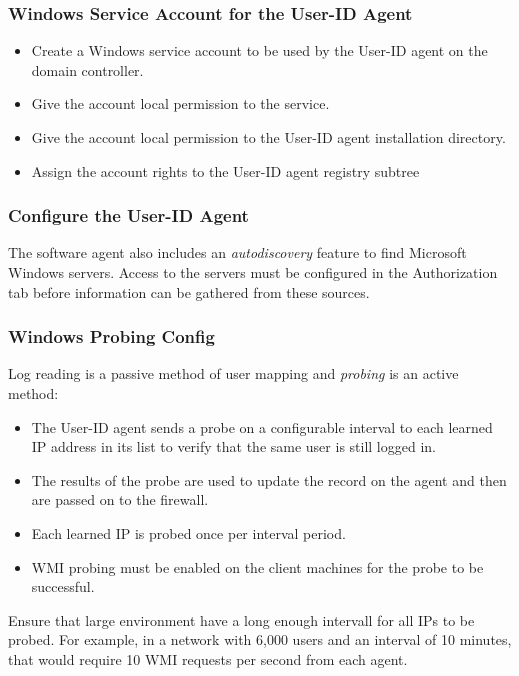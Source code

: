 \subsubsection{Windows Service Account for the User-ID Agent}
\begin{itemize}
    \item Create a Windows service account to be used by the User-ID agent on the domain controller.
    \item Give the account local permission to the service.
    \item Give the account local permission to the User-ID agent installation directory.
    \item Assign the account rights to the User-ID agent registry subtree
\end{itemize}

\subsubsection{Configure the User-ID Agent}
The software agent also includes an \textit{autodiscovery} feature to find Microsoft Windows servers.
Access to the servers must be configured in the Authorization tab before information can be gathered from these sources.

\subsubsection{Windows Probing Config}
Log reading is a passive method of user mapping and \textit{probing} is an active method:
\begin{itemize}
    \item The User-ID agent sends a probe on a configurable interval to each learned IP address in its list to verify that the same user is still logged in.
    \item The results of the probe are used to update the record on the agent and then are passed on to the firewall.
    \item Each learned IP is probed once per interval period.
    \item WMI probing must be enabled on the client machines for the probe to be successful.
\end{itemize}
Ensure that large environment have a long enough intervall for all IPs to be probed.
For example, in a network with 6,000 users and an interval of 10 minutes, that would require 10 WMI requests per second from each agent.

